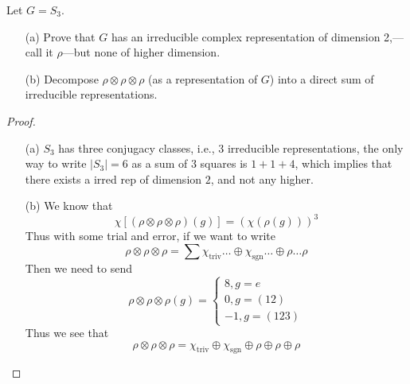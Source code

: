 \documentclass[openany]{book}
\begin{document}
\begin{prob}
    Let \(G = S_3\).
    \begin{itemize}
        \item[(a)] Prove that \(G\) has an irreducible complex representation of dimension 2,—call it \(\rho\)—but none of higher dimension.
        \item[(b)] Decompose \(\rho \otimes \rho \otimes \rho\) (as a representation of \(G\)) into a direct sum of irreducible representations.
    \end{itemize}
\end{prob}
\begin{proof}
    \begin{itemize}
        \item[(a)] $S_3$ has three conjugacy classes, i.e., $3$ irreducible representations, the only way to write $|S_3|=6$ as a sum of $3$ squares is $1+1+4$, which implies that there exists a irred rep of dimension $2$, and not any higher.
        \item[(b)] We know that 
        \begin{equation*}
            \chi\left[(\rho\otimes\rho\otimes\rho)(g)\right]=\left(\chi(\rho(g))\right)^3
        \end{equation*}
        Thus with some trial and error, if we want to write 
        \begin{equation*}
            \rho\otimes\rho\otimes\rho=\sum \chi_{\text{triv}}\dots\oplus\chi_{\text{sgn}}\dots \oplus\rho\dots\rho
        \end{equation*}
        Then we need to send 
        \begin{equation*}
            \rho\otimes\rho\otimes\rho(g)=\begin{cases}
                8, g=e\\
                0, g=(12)\\
                -1, g=(123)
            \end{cases}
        \end{equation*}
        Thus we see that 
        \begin{equation*}
            \rho\otimes\rho\otimes\rho=\chi_{\text{triv}}\oplus\chi_{\text{sgn}}\oplus\rho\oplus\rho\oplus\rho
        \end{equation*}
    \end{itemize}
\end{proof}
\end{document}

